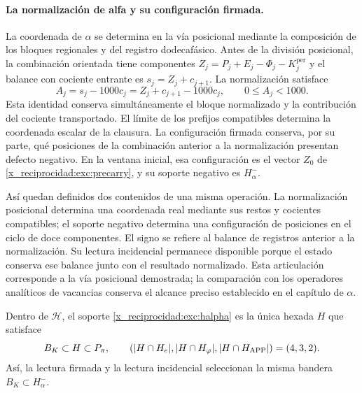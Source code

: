 \paragraph{La normalización de alfa y su configuración firmada.}
\label{x_reciprocidad:inc-ampl-clausura}
La coordenada de $\alpha$ se determina en la vía posicional mediante la
composición de los bloques regionales y del registro dodecafásico. Antes
de la división posicional, la combinación orientada tiene componentes
$Z_j=P_j+E_j-\Phi_j-K_j^{\mathrm{per}}$ y el balance con cociente entrante
es $s_j=Z_j+c_{j+1}$. La normalización satisface
\begin{equation}
 A_j=s_j-1000c_j=Z_j+c_{j+1}-1000c_j,\qquad 0\leq A_j<1000.
 \label{x_reciprocidad:inc-ampl-normalizacion}
\end{equation}
Esta identidad conserva simultáneamente el bloque normalizado y la
contribución del cociente transportado. El límite de los prefijos
compatibles determina la coordenada escalar de la clausura. La
configuración firmada conserva, por su parte, qué posiciones de la
combinación anterior a la normalización presentan defecto negativo.
En la ventana inicial, esa configuración es el vector $Z_0$ de
\eqref{x_reciprocidad:exc:precarry}, y su soporte negativo es $H^-_\alpha$.

Así quedan definidos dos contenidos de una misma operación. La
normalización posicional determina una coordenada real mediante sus
restos y cocientes compatibles; el soporte negativo determina una
configuración de posiciones en el ciclo de doce componentes. El signo se
refiere al balance de registros anterior a la normalización. Su lectura
incidencial permanece disponible porque el estado conserva ese balance
junto con el resultado normalizado. Esta articulación corresponde a la
vía posicional demostrada; la comparación con los operadores analíticos
de vacancias conserva el alcance preciso establecido en el capítulo de
$\alpha$.



\begin{proposition}
\label{x_reciprocidad:exc:selector-bandera}
Dentro de $\mathcal H$, el soporte \eqref{x_reciprocidad:exc:halpha} es la única hexada
$H$ que satisface
\[
 B_K\subset H\subset P_\pi,
 \qquad
 (|H\cap H_e|,|H\cap H_\varphi|,|H\cap H_{\rm APP}|)=(4,3,2).
\]
Así, la lectura firmada y la lectura incidencial seleccionan la misma
bandera $B_K\subset H^-_\alpha$.
\end{proposition}

